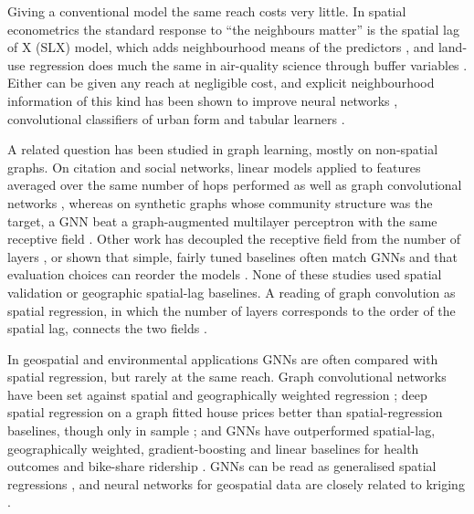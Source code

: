\documentclass[pdflatex,sn-basic]{sn-jnl}
\begin{document}
Giving a conventional model the same reach costs very little. In spatial econometrics the standard response to ``the neighbours matter'' is the spatial lag of X (SLX) model, which adds neighbourhood means of the predictors \citep{halleckvega2015}, and land-use regression does much the same in air-quality science through buffer variables \citep{hoek2008}. Either can be given any reach at negligible cost, and explicit neighbourhood information of this kind has been shown to improve neural networks \citep{xiao2023}, convolutional classifiers of urban form \citep{fleischmann2024} and tabular learners \citep{schmidinger2026}.

A related question has been studied in graph learning, mostly on non-spatial graphs. On citation and social networks, linear models applied to features averaged over the same number of hops performed as well as graph convolutional networks \citep{wu2019,frasca2020}, whereas on synthetic graphs whose community structure was the target, a GNN beat a graph-augmented multilayer perceptron with the same receptive field \citep{chen2021}. Other work has decoupled the receptive field from the number of layers \citep{gasteiger2019,zeng2021}, or shown that simple, fairly tuned baselines often match GNNs and that evaluation choices can reorder the models \citep{shchur2018,errica2020,huang2021}. None of these studies used spatial validation or geographic spatial-lag baselines. A reading of graph convolution as spatial regression, in which the number of layers corresponds to the order of the spatial lag, connects the two fields \citep{zhu2022}.

In geospatial and environmental applications GNNs are often compared with spatial regression, but rarely at the same reach. Graph convolutional networks have been set against spatial and geographically weighted regression \citep{zhu2022,liu2026}; deep spatial regression on a graph fitted house prices better than spatial-regression baselines, though only in sample \citep{zhu2026}; and GNNs have outperformed spatial-lag, geographically weighted, gradient-boosting and linear baselines for health outcomes and bike-share ridership \citep{zhao2026,mohseni2026}. GNNs can be read as generalised spatial regressions \citep{liang2023,ma2025}, and neural networks for geospatial data are closely related to kriging \citep{zhan2025,abemgnignonjifon2024}.
\end{document}
